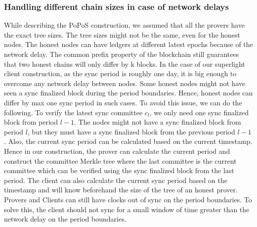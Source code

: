 \documentclass[a4paper,11pt,oneside]{article}
\theoremstyle{definition}
\begin{document}
   \subsubsection{Handling different chain sizes in case of network delays}
   While describing the PoPoS construction, we assumed that all the provers have the exact tree sizes. The tree sizes might not be the same, even for the honest nodes. The honest nodes can have ledgers at different latest epochs because of the network delay. The common prefix property of the blockchain still guarantees that two honest chains will only differ by k blocks. In the case of our superlight client construction, as the sync period is roughly one day, it is big enough to overcome any network delay between nodes. Some honest nodes might not have seen a sync finalized block during the period boundaries. Hence, honest nodes can differ by max one sync period in such cases. To avoid this issue, we can do the following. To verify the latest sync committee $c_l$, we only need one sync finalized block from period $l - 1$. The nodes might not have a sync finalized block from period $l$, but they must have a sync finalized block from the previous period $l - 1$. Also, the current sync period can be calculated based on the current timestamp. Hence in our construction, the prover can calculate the current period and construct the committee Merkle tree where the last committee is the current committee which can be verified using the sync finalized block from the last period. The client can also calculate the current sync period based on the timestamp and will know beforehand the size of the tree of an honest prover. Provers and Clients can still have clocks out of sync on the period boundaries. To solve this, the client should not sync for a small window of time greater than the network delay on the period boundaries.    
   
\end{document}
